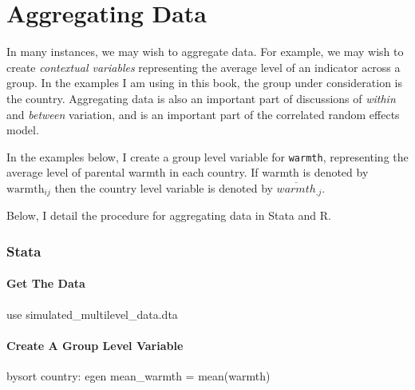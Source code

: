 \documentclass[
  letterpaper,
  DIV=11,
  numbers=noendperiod]{scrreprt}
\newenvironment{Shaded}{\begin{snugshade}}{\end{snugshade}}
\newcommand{\KeywordTok}[1]{\textcolor[rgb]{0.00,0.23,0.31}{#1}}
\newcommand{\NormalTok}[1]{\textcolor[rgb]{0.00,0.23,0.31}{#1}}
\begin{document}
\chapter{Aggregating Data}\label{aggregating-data}

In many instances, we may wish to aggregate data. For example, we may
wish to create \emph{contextual variables} representing the average
level of an indicator across a group. In the examples I am using in this
book, the group under consideration is the country. Aggregating data is
also an important part of discussions of \emph{within} and
\emph{between} variation, and is an important part of the correlated
random effects model.

In the examples below, I create a group level variable for
\texttt{warmth}, representing the average level of parental warmth in
each country. If warmth is denoted by \(\text{warmth}_{ij}\) then the
country level variable is denoted by \(\overline{warmth}_{.j}\).

Below, I detail the procedure for aggregating data in Stata and R.

\subsection{Stata}

\subsubsection{Get The Data}\label{get-the-data-14}

\begin{Shaded}
\begin{Highlighting}[]

\KeywordTok{use}\NormalTok{ simulated\_multilevel\_data.dta}
\end{Highlighting}
\end{Shaded}

\subsubsection{Create A Group Level
Variable}\label{create-a-group-level-variable}

\begin{Shaded}
\begin{Highlighting}[]

\KeywordTok{bysort}\NormalTok{ country: }\KeywordTok{egen}\NormalTok{ mean\_warmth = }\KeywordTok{mean}\NormalTok{(warmth)}
\end{Highlighting}
\end{Shaded}
\end{document}

